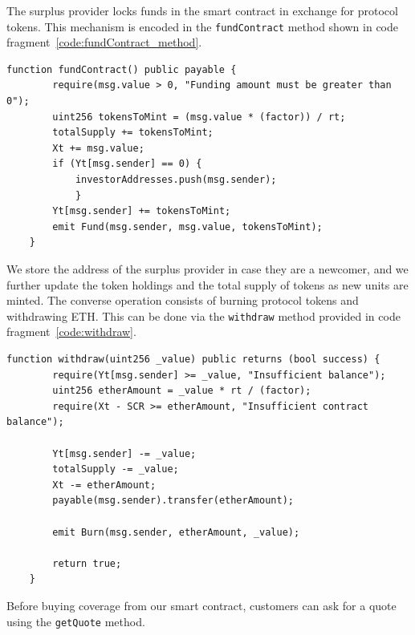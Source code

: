 \documentclass[10pt]{article}
\begin{document}
The surplus provider locks funds in the smart contract in exchange for protocol tokens. This mechanism is encoded in the \texttt{fundContract} method shown in code fragment~\ref{code:fundContract_method}.

\begin{codefragment}[!h]
\begin{lstlisting}[language=Solidity]
function fundContract() public payable {
        require(msg.value > 0, "Funding amount must be greater than 0");
        uint256 tokensToMint = (msg.value * (factor)) / rt;
        totalSupply += tokensToMint;
        Xt += msg.value;
        if (Yt[msg.sender] == 0) {
            investorAddresses.push(msg.sender);
            }
        Yt[msg.sender] += tokensToMint;
        emit Fund(msg.sender, msg.value, tokensToMint);
    }
        \end{lstlisting}
    \caption{fundContract method of \texttt{InsuranceLogic}}
    \label{code:fundContract_method}
\end{codefragment}

We store the address of the surplus provider in case they are a newcomer, and we further update the token holdings and the total supply of tokens as new units are minted. The converse operation consists of burning protocol tokens and withdrawing ETH. This can be done via the \texttt{withdraw} method provided in code fragment~\ref{code:withdraw}.


\begin{codefragment}[!h]
\begin{lstlisting}[language=Solidity]
 function withdraw(uint256 _value) public returns (bool success) {
        require(Yt[msg.sender] >= _value, "Insufficient balance");
        uint256 etherAmount = _value * rt / (factor);
        require(Xt - SCR >= etherAmount, "Insufficient contract balance");

        Yt[msg.sender] -= _value;
        totalSupply -= _value;
        Xt -= etherAmount;
        payable(msg.sender).transfer(etherAmount);

        emit Burn(msg.sender, etherAmount, _value);
        
        return true;
    }
\end{lstlisting}
    \caption{withdraw method of \texttt{InsuranceLogic}}
    \label{code:withdraw_method}
\end{codefragment}

Before buying coverage from our smart contract, customers can ask for a quote using the \texttt{getQuote} method.
\end{document}
